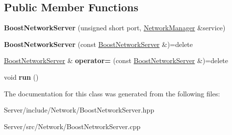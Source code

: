 \subsection*{Public Member Functions}
\begin{DoxyCompactItemize}
\item 
\mbox{\label{classbbl_1_1srv_1_1_boost_network_server_a6831661826ea6906ddd798ec3414294a}} 
{\bfseries Boost\+Network\+Server} (unsigned short port, \hyperlink{classbbl_1_1srv_1_1_network_manager}{Network\+Manager} \&service)
\item 
\mbox{\label{classbbl_1_1srv_1_1_boost_network_server_ab909811fb953a738a7ae537d16054100}} 
{\bfseries Boost\+Network\+Server} (const \hyperlink{classbbl_1_1srv_1_1_boost_network_server}{Boost\+Network\+Server} \&)=delete
\item 
\mbox{\label{classbbl_1_1srv_1_1_boost_network_server_a26870afa82287b1dc2f63ec076970738}} 
\hyperlink{classbbl_1_1srv_1_1_boost_network_server}{Boost\+Network\+Server} \& {\bfseries operator=} (const \hyperlink{classbbl_1_1srv_1_1_boost_network_server}{Boost\+Network\+Server} \&)=delete
\item 
\mbox{\label{classbbl_1_1srv_1_1_boost_network_server_a76142867d491aa36761ef8fe76d6ec36}} 
void {\bfseries run} ()
\end{DoxyCompactItemize}


The documentation for this class was generated from the following files\+:\begin{DoxyCompactItemize}
\item 
Server/include/\+Network/Boost\+Network\+Server.\+hpp\item 
Server/src/\+Network/Boost\+Network\+Server.\+cpp\end{DoxyCompactItemize}
